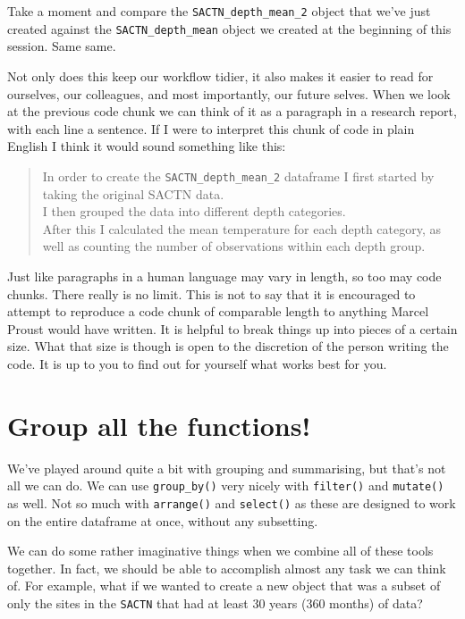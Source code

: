 \documentclass[]{book}
\theoremstyle{definition}
\theoremstyle{definition}
\theoremstyle{definition}
\theoremstyle{remark}
\begin{document}
Take a moment and compare the \texttt{SACTN\_depth\_mean\_2} object that
we've just created against the \texttt{SACTN\_depth\_mean} object we
created at the beginning of this session. Same same.

Not only does this keep our workflow tidier, it also makes it easier to
read for ourselves, our colleagues, and most importantly, our future
selves. When we look at the previous code chunk we can think of it as a
paragraph in a research report, with each line a sentence. If I were to
interpret this chunk of code in plain English I think it would sound
something like this:

\begin{quote}
In order to create the \texttt{SACTN\_depth\_mean\_2} dataframe I first
started by taking the original SACTN data.\\
I then grouped the data into different depth categories.\\
After this I calculated the mean temperature for each depth category, as
well as counting the number of observations within each depth group.
\end{quote}

Just like paragraphs in a human language may vary in length, so too may
code chunks. There really is no limit. This is not to say that it is
encouraged to attempt to reproduce a code chunk of comparable length to
anything Marcel Proust would have written. It is helpful to break things
up into pieces of a certain size. What that size is though is open to
the discretion of the person writing the code. It is up to you to find
out for yourself what works best for you.

\section{Group all the functions!}\label{group-all-the-functions}

We've played around quite a bit with grouping and summarising, but
that's not all we can do. We can use \texttt{group\_by()} very nicely
with \texttt{filter()} and \texttt{mutate()} as well. Not so much with
\texttt{arrange()} and \texttt{select()} as these are designed to work
on the entire dataframe at once, without any subsetting.

We can do some rather imaginative things when we combine all of these
tools together. In fact, we should be able to accomplish almost any task
we can think of. For example, what if we wanted to create a new object
that was a subset of only the sites in the \texttt{SACTN} that had at
least 30 years (360 months) of data?
\end{document}
